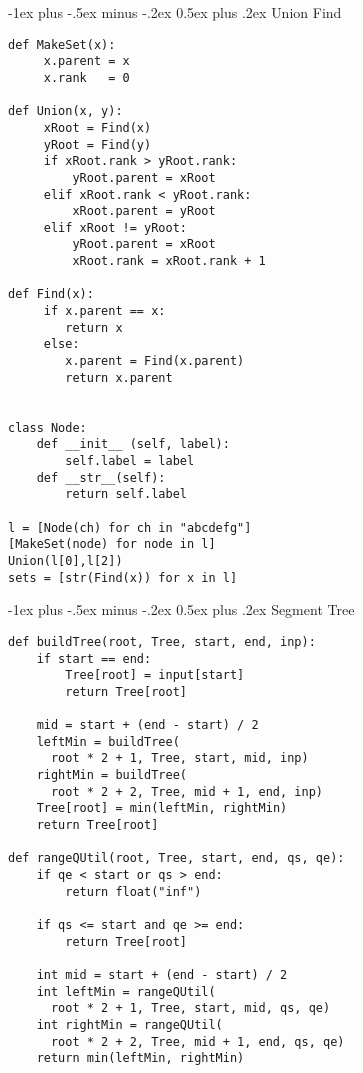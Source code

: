 \documentclass[10pt,landscape]{article}
\makeatletter
\renewcommand{\section}{\@startsection{section}{1}{0mm}%
                                {-1ex plus -.5ex minus -.2ex}%
                                {0.5ex plus .2ex}%
                                {\normalfont\large\bfseries}}
\makeatother
\begin{document}
\begin{multicols}{3}
\section{Union Find}

\begin{verbatim}
def MakeSet(x):
     x.parent = x
     x.rank   = 0

def Union(x, y):
     xRoot = Find(x)
     yRoot = Find(y)
     if xRoot.rank > yRoot.rank:
         yRoot.parent = xRoot
     elif xRoot.rank < yRoot.rank:
         xRoot.parent = yRoot
     elif xRoot != yRoot: 
         yRoot.parent = xRoot
         xRoot.rank = xRoot.rank + 1

def Find(x):
     if x.parent == x:
        return x
     else:
        x.parent = Find(x.parent)
        return x.parent


class Node:
    def __init__ (self, label):
        self.label = label
    def __str__(self):
        return self.label

l = [Node(ch) for ch in "abcdefg"]
[MakeSet(node) for node in l]
Union(l[0],l[2])
sets = [str(Find(x)) for x in l]
\end{verbatim}

\section{Segment Tree}

\begin{verbatim}
def buildTree(root, Tree, start, end, inp):
    if start == end:
        Tree[root] = input[start]
        return Tree[root]

    mid = start + (end - start) / 2
    leftMin = buildTree(
      root * 2 + 1, Tree, start, mid, inp)
    rightMin = buildTree(
      root * 2 + 2, Tree, mid + 1, end, inp)
    Tree[root] = min(leftMin, rightMin)
    return Tree[root]

def rangeQUtil(root, Tree, start, end, qs, qe):
    if qe < start or qs > end:
        return float("inf")

    if qs <= start and qe >= end:
        return Tree[root]

    int mid = start + (end - start) / 2
    int leftMin = rangeQUtil(
      root * 2 + 1, Tree, start, mid, qs, qe)
    int rightMin = rangeQUtil(
      root * 2 + 2, Tree, mid + 1, end, qs, qe)
    return min(leftMin, rightMin)


\end{verbatim}
\end{multicols}
\end{document}
